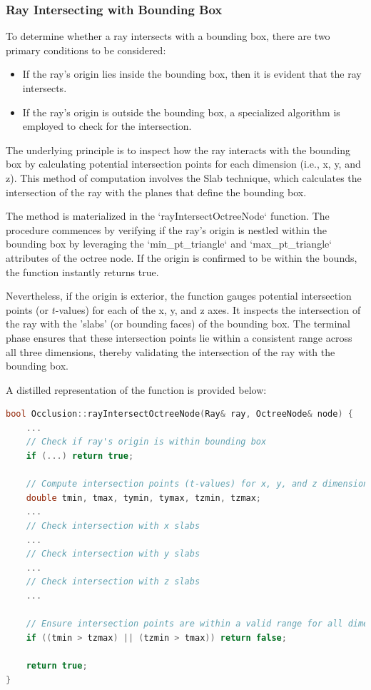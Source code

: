 \documentclass[11pt, a4paper,oneside,chapterprefix=false]{scrbook}
\begin{document}
\subsubsection{Ray Intersecting with Bounding Box}

To determine whether a ray intersects with a bounding box, there are two primary conditions to be considered:

\begin{itemize}
    \item If the ray's origin lies inside the bounding box, then it is evident that the ray intersects.
    \item If the ray's origin is outside the bounding box, a specialized algorithm is employed to check for the intersection.
\end{itemize}

The underlying principle is to inspect how the ray interacts with the bounding box by calculating potential intersection points for each dimension (i.e., x, y, and z). This method of computation involves the Slab technique, which calculates the intersection of the ray with the planes that define the bounding box.

The method is materialized in the `rayIntersectOctreeNode` function. The procedure commences by verifying if the ray's origin is nestled within the bounding box by leveraging the `min\_pt\_triangle` and `max\_pt\_triangle` attributes of the octree node. If the origin is confirmed to be within the bounds, the function instantly returns true.

Nevertheless, if the origin is exterior, the function gauges potential intersection points (or \( t \)-values) for each of the x, y, and z axes. It inspects the intersection of the ray with the 'slabs' (or bounding faces) of the bounding box. The terminal phase ensures that these intersection points lie within a consistent range across all three dimensions, thereby validating the intersection of the ray with the bounding box.

A distilled representation of the function is provided below:

\begin{lstlisting}[language=C++, caption=Simplified Ray Intersect Bounding Box]
bool Occlusion::rayIntersectOctreeNode(Ray& ray, OctreeNode& node) {
    ...
    // Check if ray's origin is within bounding box
    if (...) return true;
    
    // Compute intersection points (t-values) for x, y, and z dimensions
    double tmin, tmax, tymin, tymax, tzmin, tzmax;
    ...
    // Check intersection with x slabs
    ...
    // Check intersection with y slabs
    ...
    // Check intersection with z slabs
    ...

    // Ensure intersection points are within a valid range for all dimensions
    if ((tmin > tzmax) || (tzmin > tmax)) return false;
    
    return true;
}
\end{lstlisting}
\end{document}
